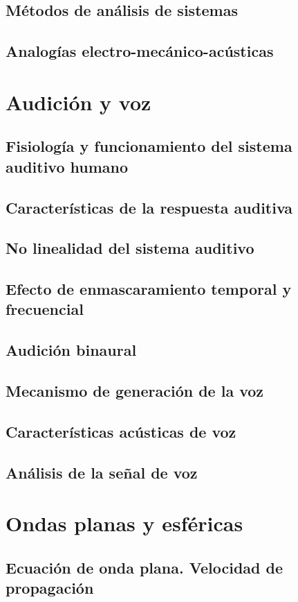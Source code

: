 \documentclass[a4paper]{book}
\begin{document}
\section{Métodos de análisis de sistemas}
\section{Analogías electro-mecánico-acústicas}

\chapter{Audición y voz}
\section{Fisiología y funcionamiento del sistema auditivo humano}
\section{Características de la respuesta auditiva}
\section{No linealidad del sistema auditivo}
\section{Efecto de enmascaramiento temporal y frecuencial}
\section{Audición binaural}
\section{Mecanismo de generación de la voz}
\section{Características acústicas de voz}
\section{Análisis de la señal de voz}

\chapter{Ondas planas y esféricas}
\section{Ecuación de onda plana. Velocidad de propagación}
\end{document}
